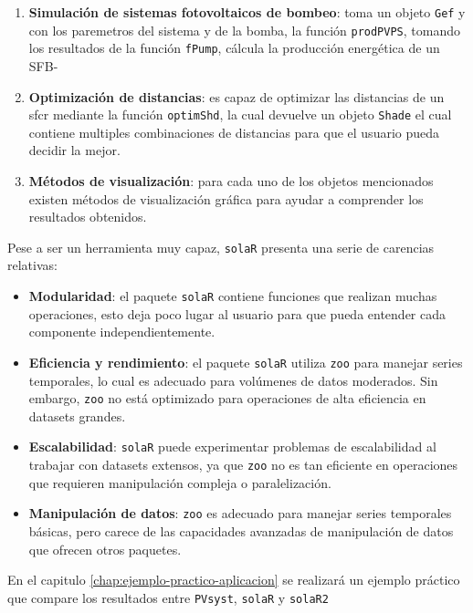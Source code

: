 \begin{enumerate}
\item \textbf{Simulación de sistemas fotovoltaicos de bombeo}: toma un objeto \texttt{Gef} y con los paremetros del sistema y de la bomba, la función \texttt{prodPVPS}, tomando los resultados de la función \texttt{fPump}, cálcula la producción energética de un SFB-
\item \textbf{Optimización de distancias}: es capaz de optimizar las distancias de un sfcr mediante la función \texttt{optimShd}, la cual devuelve un objeto \texttt{Shade} el cual contiene multiples combinaciones de distancias para que el usuario pueda decidir la mejor.
\item \textbf{Métodos de visualización}: para cada uno de los objetos mencionados existen métodos de visualización gráfica para ayudar a comprender los resultados obtenidos.
\end{enumerate}

Pese a ser un herramienta muy capaz, \texttt{solaR} presenta una serie de carencias relativas:
\begin{itemize}
\item \textbf{Modularidad}: el paquete \texttt{solaR} contiene funciones que realizan muchas operaciones, esto deja poco lugar al usuario para que pueda entender cada componente independientemente.
\item \textbf{Eficiencia y rendimiento}: el paquete \texttt{solaR} utiliza \texttt{zoo} para manejar series temporales, lo cual es adecuado para volúmenes de datos moderados. Sin embargo, \texttt{zoo} no está optimizado para operaciones de alta eficiencia en datasets grandes.
\item \textbf{Escalabilidad}: \texttt{solaR} puede experimentar problemas de escalabilidad al trabajar con datasets extensos, ya que \texttt{zoo} no es tan eficiente en operaciones que requieren manipulación compleja o paralelización.
\item \textbf{Manipulación de datos}: \texttt{zoo} es adecuado para manejar series temporales básicas, pero carece de las capacidades avanzadas de manipulación de datos que ofrecen otros paquetes.
\end{itemize}

En el capitulo \ref{chap:ejemplo-practico-aplicacion} se realizará un ejemplo práctico que compare los resultados entre \texttt{PVsyst}, \texttt{solaR} y \texttt{solaR2}
